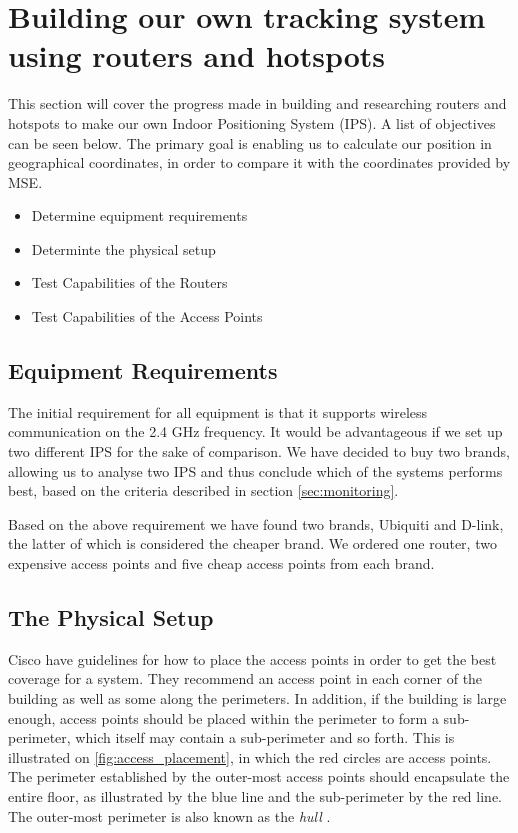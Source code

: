 \section{Building our own tracking system using routers and hotspots} \label{sec:ourSys}
This section will cover the progress made in building and researching routers and hotspots to make our own Indoor Positioning System (IPS). A list of objectives can be seen below. The primary goal is enabling us to calculate our position in geographical coordinates, in order to compare it with the coordinates provided by MSE.

\begin{itemize}
	\item Determine equipment requirements
	\item Determinte the physical setup
	\item Test Capabilities of the Routers
	\item Test Capabilities of the Access Points
\end{itemize}

\subsection*{Equipment Requirements}
The initial requirement for all equipment is that it supports wireless communication on the 2.4 GHz frequency. It would be advantageous if we set up two different IPS for the sake of comparison. We have decided to buy two brands, allowing us to analyse two IPS and thus conclude which of the systems performs best, based on the criteria described in section \ref{sec:monitoring}.

Based on the above requirement we have found two brands, Ubiquiti and D-link, the latter of which is considered the cheaper brand. We ordered one router, two expensive access points and five cheap access points from each brand.

\subsection*{The Physical Setup}
Cisco \cite{access_point_placement} have guidelines for how to place the access points in order to get the best coverage for a system. They recommend an access point in each corner of the building as well as some along the perimeters. In addition, if the building is large enough, access points should be placed within the perimeter to form a sub-perimeter, which itself may contain a sub-perimeter and so forth. This is illustrated on \cref{fig:access_placement}, in which the red circles are access points. The perimeter established by the outer-most access points should encapsulate the entire floor, as illustrated by the blue line and the sub-perimeter by the red line. The outer-most perimeter is also known as the \textit{hull} \cite{access_point_placement}.

